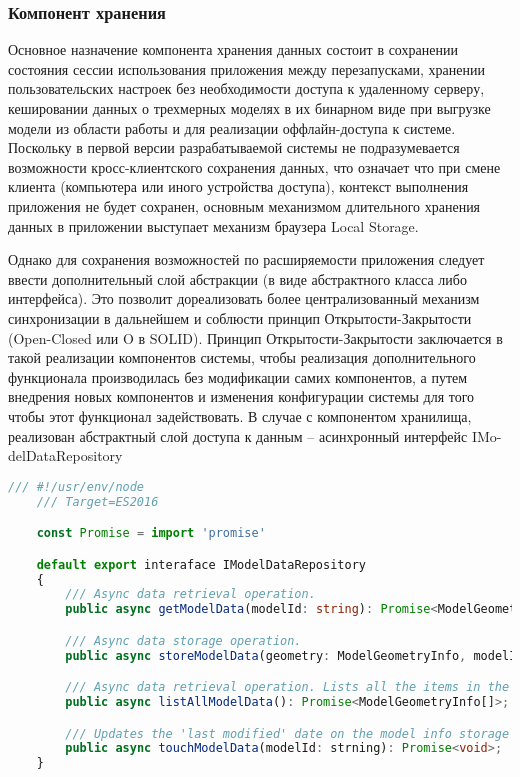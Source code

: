 \subsubsection{Компонент хранения}
\label{sub:theory:components:persistance}

Основное назначение компонента хранения данных состоит в сохранении состояния сессии использования приложения между перезапусками, хранении пользовательских настроек без необходимости доступа к
удаленному серверу, кешировании данных о трехмерных моделях в их бинарном виде при выгрузке модели из области работы и для реализации оффлайн-доступа к системе.
Поскольку в первой версии разрабатываемой системы не подразумевается возможности кросс-клиентского сохранения данных, что означает что при смене клиента (компьютера или иного устройства доступа),
контекст выполнения приложения не будет сохранен, основным механизмом длительного хранения данных в приложении выступает механизм браузера Local Storage.

Однако для сохранения возможностей по расширяемости приложения следует ввести дополнительный слой абстракции (в виде абстрактного класса либо интерфейса). Это позволит дореализовать более
централизованный механизм синхронизации в дальнейшем и соблюсти принцип Открытости-Закрытости (Open-Closed или O в SOLID). Принцип Открытости-Закрытости заключается в такой реализации
компонентов системы, чтобы реализация дополнительного функционала производилась без модификации самих компонентов, а путем внедрения новых компонентов и изменения конфигурации системы для того чтобы
этот функционал задействовать. В случае с компонентом хранилища, реализован абстрактный слой доступа к данным -- асинхронный интерфейс IMo-delDataRepository

 \begin{lstlisting}[language=TypeScript, label=lst:domain:html]
    /// #!/usr/env/node
    /// Target=ES2016

    const Promise = import 'promise'

    default export interaface IModelDataRepository
    {
        /// Async data retrieval operation.
        public async getModelData(modelId: string): Promise<ModelGeometryInfo>;

        /// Async data storage operation.
        public async storeModelData(geometry: ModelGeometryInfo, modelId: strning): Promise<void>;

        /// Async data retrieval operation. Lists all the items in the storage.
        public async listAllModelData(): Promise<ModelGeometryInfo[]>;

        /// Updates the 'last modified' date on the model info storage item.
        public async touchModelData(modelId: strning): Promise<void>;
    }
\end{lstlisting}

